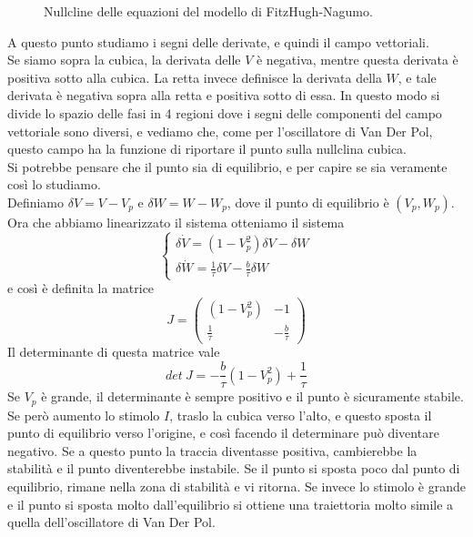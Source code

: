 \documentclass[12pt]{article}
\begin{document}
\begin{figure}[H]
	\centering
	
	\caption{Nullcline delle equazioni del modello di FitzHugh-Nagumo.}
\end{figure}
A questo punto studiamo i segni delle derivate, e quindi il campo vettoriali. \\
Se siamo sopra la cubica, la derivata delle $V$ è negativa, mentre questa derivata è positiva sotto alla cubica. La retta invece definisce la derivata della $W$, e tale derivata è negativa sopra alla retta e positiva sotto di essa. In questo modo si divide lo spazio delle fasi in 4 regioni dove i segni delle componenti del campo vettoriale sono diversi, e vediamo che, come per l'oscillatore di Van Der Pol, questo campo ha la funzione di riportare il punto sulla nullclina cubica. \\
Si potrebbe pensare che il punto sia di equilibrio, e per capire se sia veramente così lo studiamo. \\
Definiamo $\delta V = V - V_p$ e $\delta W = W - W_p$, dove il punto di equilibrio è $(V_p,W_p)$. Ora che abbiamo linearizzato il sistema otteniamo il sistema
\begin{equation}
	\begin{cases}
		\delta \dot{V} = (1-V^2_p)\delta V - \delta W \\
		\delta \dot{W} = \frac{1}{\tau}\delta V - \frac{b}{\tau}\delta W 
	\end{cases}
\end{equation}
e così è definita la matrice 
\begin{equation}
	J = \begin{pmatrix}
		(1-V_p^2) & -1 \\
		\frac{1}{\tau} & -\frac{b}{\tau}
	\end{pmatrix}
\end{equation}
Il determinante di questa matrice vale
$$
	det \ J = -\frac{b}{\tau}(1-V_p^2) + \frac{1}{\tau}
$$
Se $V_p$ è grande, il determinante è sempre positivo e il punto è sicuramente stabile. \\
Se però aumento lo stimolo $I$, traslo la cubica verso l'alto, e questo sposta il punto di equilibrio verso l'origine, e così facendo il determinare può diventare negativo. Se a questo punto la traccia diventasse positiva, cambierebbe la stabilità e il punto diventerebbe instabile. Se il punto si sposta poco dal punto di equilibrio, rimane nella zona di stabilità e vi ritorna. Se invece lo stimolo è grande e il punto si sposta molto dall'equilibrio si ottiene una traiettoria molto simile a quella dell'oscillatore di Van Der Pol. \\ 
\end{document}
